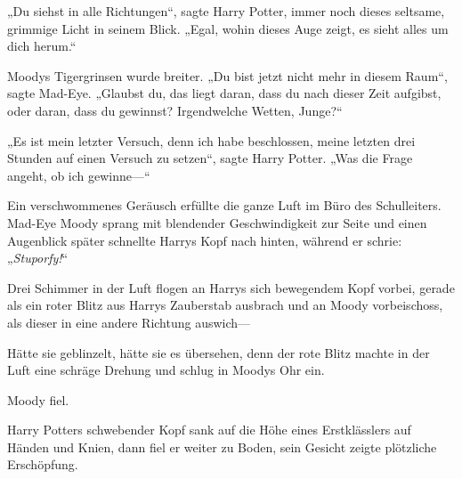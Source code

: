 „Du siehst in alle Richtungen“, sagte Harry Potter, immer noch dieses seltsame, grimmige Licht in seinem Blick. „Egal, wohin dieses Auge zeigt, es sieht alles um dich herum.“

Moodys Tigergrinsen wurde breiter. „Du bist jetzt nicht mehr in diesem Raum“, sagte Mad-Eye. „Glaubst du, das liegt daran, dass du nach dieser Zeit aufgibst, oder daran, dass du gewinnst? Irgendwelche Wetten, Junge?“

„Es ist mein letzter Versuch, denn ich habe beschlossen, meine letzten drei Stunden auf einen Versuch zu setzen“, sagte Harry Potter. „Was die Frage angeht, ob ich gewinne—“

Ein verschwommenes Geräusch erfüllte die ganze Luft im Büro des Schulleiters. Mad-Eye Moody sprang mit blendender Geschwindigkeit zur Seite und einen Augenblick später schnellte Harrys Kopf nach hinten, während er schrie: „\emph{Stuporfy!}“

Drei Schimmer in der Luft flogen an Harrys sich bewegendem Kopf vorbei, gerade als ein roter Blitz aus Harrys Zauberstab ausbrach und an Moody vorbeischoss, als dieser in eine andere Richtung auswich—

Hätte sie geblinzelt, hätte sie es übersehen, denn der rote Blitz machte in der Luft eine schräge Drehung und schlug in Moodys Ohr ein.

Moody fiel.

Harry Potters schwebender Kopf sank auf die Höhe eines Erstklässlers auf Händen und Knien, dann fiel er weiter zu Boden, sein Gesicht zeigte plötzliche Erschöpfung.

